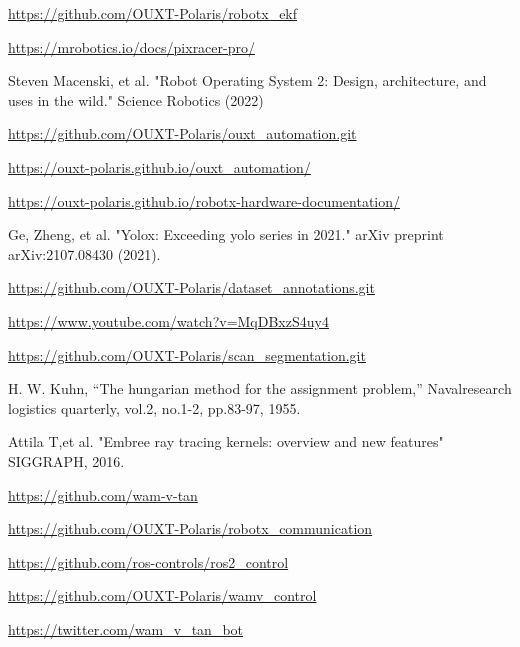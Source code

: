 \documentclass[lettersize,journal]{IEEEtran}
\begin{document}
\begin{thebibliography}{1}

    \url{https://github.com/OUXT-Polaris/robotx_ekf}

    \url{https://mrobotics.io/docs/pixracer-pro/}

    Steven Macenski, et al. "Robot Operating System 2: Design, architecture, and uses in the wild." Science Robotics (2022)

    \url{https://github.com/OUXT-Polaris/ouxt_automation.git}

    \url{https://ouxt-polaris.github.io/ouxt_automation/}

    \url{https://ouxt-polaris.github.io/robotx-hardware-documentation/}

    Ge, Zheng, et al. "Yolox: Exceeding yolo series in 2021." arXiv preprint arXiv:2107.08430 (2021).

    \url{https://github.com/OUXT-Polaris/dataset_annotations.git}

    \url{https://www.youtube.com/watch?v=MqDBxzS4uy4}

    \url{https://github.com/OUXT-Polaris/scan_segmentation.git}

    H. W. Kuhn, “The hungarian method for the assignment problem,” Navalresearch logistics quarterly, vol.2, no.1-2, pp.83-97, 1955.

    Attila T,et al. "Embree ray tracing kernels: overview and new features" SIGGRAPH, 2016.

    \url{https://github.com/wam-v-tan}

    \url{https://github.com/OUXT-Polaris/robotx_communication}

    \url{https://github.com/ros-controls/ros2_control}

    \url{https://github.com/OUXT-Polaris/wamv_control}

    \url{https://twitter.com/wam_v_tan_bot}

\end{thebibliography}

\vfill
\end{document}

